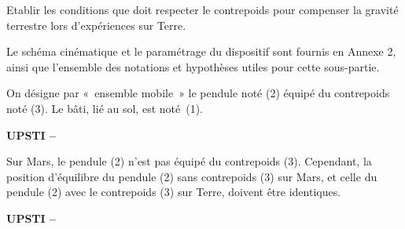 %
%
%
%
%



\begin{obj}
Etablir les conditions que doit respecter le contrepoids pour compenser la gravité terrestre lors d'expériences sur Terre.
\end{obj}
 
\ifprof
\else
Le schéma cinématique et le paramétrage du dispositif sont fournis en Annexe 2, ainsi que l'ensemble des notations et hypothèses utiles pour cette sous-partie.

On désigne par «~ensemble mobile~» le pendule noté (2) équipé du contrepoids noté (3). Le bâti, lié au sol, est noté~(1).
\fi

\ifprof
\begin{corrige}
\textbf{UPSTI -- }
\end{corrige}

\else
\fi

\ifprof
\else
Sur Mars, le pendule (2) n'est pas équipé du contrepoids (3). Cependant, la position d'équilibre du pendule (2) sans contrepoids (3) sur Mars, et celle du pendule (2) avec le contrepoids (3) sur Terre, doivent être identiques.
\fi
{}
\ifprof
\begin{corrige}
\textbf{UPSTI -- }

\end{corrige}
\else
\fi



